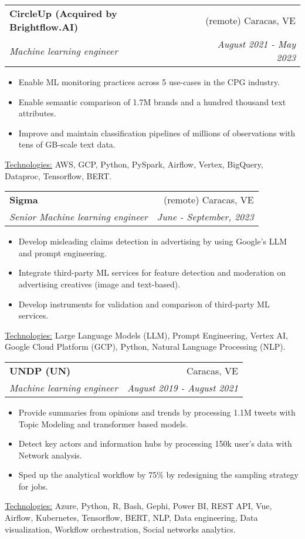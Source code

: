 \documentclass[letterpaper,11pt]{article}
\makeatletter
\newcommand{\sepsection}{\vspace{25pt}}
\newcommand{\resumeItem}[1]{%
  \item\small{
    #1
  }
}
\newcommand{\resumeSubheading}[4]{
  \vspace{8pt}\item%
    \begin{tabular*}{0.97\textwidth}[t]{l@{\extracolsep{\fill}}r}
      \textbf{#1} & #2 \\
      \textit{\small#3} & \textit{\small #4} \\
    \end{tabular*}\vspace{-5pt}
}
\newcommand{\resumeItemListStart}{\begin{itemize}}
\newcommand{\resumeItemListEnd}{\end{itemize}\vspace{-5pt}}
\newcommand{\resumeTech}[2]{
 \underline{#1:} #2
}
\makeatother
\begin{document}
    \resumeSubheading
      {CircleUp (Acquired by Brightflow.AI)}{(remote) Caracas, VE}
      {Machine learning engineer}{August 2021 - May 2023}
      \resumeItemListStart
      \resumeItem{Enable ML monitoring practices across 5 use-cases in the CPG industry.}
      \resumeItem{Enable semantic comparison of 1.7M brands and a hundred thousand text attributes.}
      \resumeItem{Improve and maintain classification pipelines of millions of observations with tens of GB-scale text data.}
      \resumeItemListEnd
      \resumeTech{Technologies}{AWS, GCP, Python, PySpark, Airflow, Vertex, BigQuery, Dataproc, Tensorflow, BERT.}\\
    \sepsection

    \resumeSubheading
      {Sigma}{(remote) Caracas, VE}
      {Senior Machine learning engineer}{June - September, 2023}
      \resumeItemListStart
      \resumeItem{Develop misleading claims detection in advertising by using Google's LLM and prompt engineering.}
      \resumeItem{Integrate third-party ML services for feature detection and moderation on advertising creatives (image and text-based).}
      \resumeItem{Develop instruments for validation and comparison of third-party ML services.}
      \resumeItemListEnd
      \resumeTech{Technologies}{Large Language Models (LLM), Prompt Engineering, Vertex AI, Google Cloud Platform (GCP), Python, Natural Language Processing (NLP).}\\
    \sepsection

    \resumeSubheading
      {UNDP (UN)}{Caracas, VE}
      {Machine learning engineer}{August 2019 - August 2021}
      \resumeItemListStart
      \resumeItem{Provide summaries from opinions and trends by processing 1.1M tweets with Topic Modeling \newline and transformer based models.}
      \resumeItem{Detect key actors and information hubs by processing 150k user's data with Network analysis.}
      \resumeItem{Sped up the analytical workflow by 75\% by redesigning the sampling strategy for jobs.}
      \resumeItemListEnd
      \resumeTech{Technologies}{Azure, Python, R, Bash, Gephi, Power BI, REST API, Vue, Airflow, Kubernetes, Tensorflow, BERT, NLP, Data engineering, Data visualization, Workflow orchestration, Social networks analytics.}\\
\end{document}
